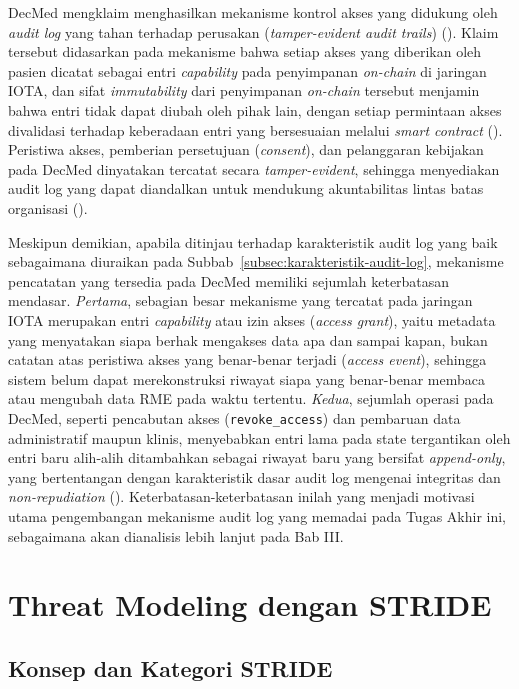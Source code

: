 DecMed mengklaim menghasilkan mekanisme kontrol akses yang didukung
oleh \textit{audit log} yang tahan terhadap perusakan
(\textit{tamper-evident audit trails}) (\cite{DecMed}). Klaim tersebut
didasarkan pada mekanisme bahwa setiap akses yang diberikan oleh
pasien dicatat sebagai entri \textit{capability} pada penyimpanan
\textit{on-chain} di jaringan IOTA, dan sifat \textit{immutability}
dari penyimpanan \textit{on-chain} tersebut menjamin bahwa entri tidak
dapat diubah oleh pihak lain, dengan setiap permintaan akses
divalidasi terhadap keberadaan entri yang bersesuaian melalui
\textit{smart contract} (\cite{DecMed}). Peristiwa akses, pemberian
persetujuan (\textit{consent}), dan pelanggaran kebijakan pada DecMed
dinyatakan tercatat secara \textit{tamper-evident}, sehingga
menyediakan audit log yang dapat diandalkan untuk mendukung
akuntabilitas lintas batas organisasi (\cite{DecMed}).

Meskipun demikian, apabila ditinjau terhadap karakteristik audit log
yang baik sebagaimana diuraikan pada
Subbab~\ref{subsec:karakteristik-audit-log}, mekanisme pencatatan yang
tersedia pada DecMed memiliki sejumlah keterbatasan mendasar.
\textit{Pertama}, sebagian besar mekanisme yang tercatat pada jaringan
IOTA merupakan entri \textit{capability} atau izin akses
(\textit{access grant}), yaitu metadata yang menyatakan siapa berhak
mengakses data apa dan sampai kapan, bukan catatan atas peristiwa
akses yang benar-benar terjadi (\textit{access event}), sehingga
sistem belum dapat merekonstruksi riwayat siapa yang benar-benar
membaca atau mengubah data RME pada waktu tertentu. \textit{Kedua},
sejumlah operasi pada DecMed, seperti pencabutan akses
(\texttt{revoke\_access}) dan pembaruan data administratif maupun
klinis, menyebabkan entri lama pada state tergantikan oleh entri baru
alih-alih ditambahkan sebagai riwayat baru yang bersifat
\textit{append-only}, yang bertentangan dengan karakteristik dasar
audit log mengenai integritas dan \textit{non-repudiation}
(\cite{DecMed}). Keterbatasan-keterbatasan inilah yang menjadi
motivasi utama pengembangan mekanisme audit log yang memadai pada
Tugas Akhir ini, sebagaimana akan dianalisis lebih lanjut pada Bab III.

\section{Threat Modeling dengan STRIDE}
\label{sec:stride}

\subsection{Konsep dan Kategori STRIDE}
\label{subsec:konsep-kategori-stride}

